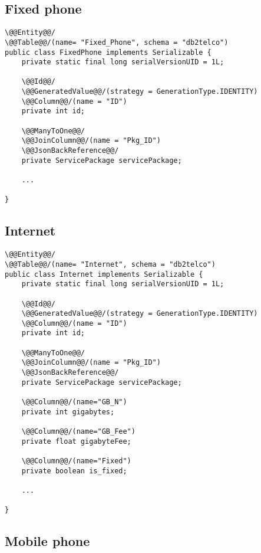 \subsection*{Fixed phone}

\begin{lstlisting}[style = JPA]
\@@Entity@@/
\@@Table@@/(name= "Fixed_Phone", schema = "db2telco")
public class FixedPhone implements Serializable {
    private static final long serialVersionUID = 1L;

    \@@Id@@/
    \@@GeneratedValue@@/(strategy = GenerationType.IDENTITY)
    \@@Column@@/(name = "ID")
    private int id;

    \@@ManyToOne@@/
    \@@JoinColumn@@/(name = "Pkg_ID")
    \@@JsonBackReference@@/
    private ServicePackage servicePackage;

    ...

}
\end{lstlisting}

\subsection*{Internet}

\begin{lstlisting}[style = JPA]
\@@Entity@@/
\@@Table@@/(name= "Internet", schema = "db2telco")
public class Internet implements Serializable {
    private static final long serialVersionUID = 1L;

    \@@Id@@/
    \@@GeneratedValue@@/(strategy = GenerationType.IDENTITY)
    \@@Column@@/(name = "ID")
    private int id;

    \@@ManyToOne@@/
    \@@JoinColumn@@/(name = "Pkg_ID")
    \@@JsonBackReference@@/
    private ServicePackage servicePackage;

    \@@Column@@/(name="GB_N")
    private int gigabytes;

    \@@Column@@/(name="GB_Fee")
    private float gigabyteFee;

    \@@Column@@/(name="Fixed")
    private boolean is_fixed;
    
    ...

}
\end{lstlisting}

\subsection*{Mobile phone}

